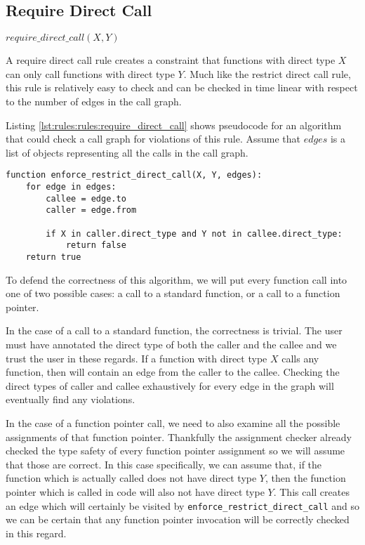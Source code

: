 \subsection{Require Direct Call}

\begin{center}
    $require\_direct\_call(X, Y)$
\end{center}

A require direct call rule creates a constraint that functions with direct type $X$ can only call functions with direct type $Y$. Much like the restrict direct call rule, this rule is relatively easy to check and can be checked in time linear with respect to the number of edges in the call graph.

Listing \ref{lst:rules:rules:require_direct_call} shows pseudocode for an algorithm that could check a call graph for violations of this rule.  Assume that $edges$ is a list of objects representing all the calls in the call graph.  

\noindent\begin{minipage}[t]{\linewidth}
\begin{lstlisting}[caption={Pseudocode for an algorithm that could check a $require\_direct\_call$ constraint.  This algorithm returns \lstinline{true} if the call graph respects the constraint and \lstinline{false} if the call graph violates it.},label={lst:rules:rules:require_direct_call}]
function enforce_restrict_direct_call(X, Y, edges):
    for edge in edges:
        callee = edge.to
        caller = edge.from

        if X in caller.direct_type and Y not in callee.direct_type:
            return false
    return true
\end{lstlisting}
\end{minipage}

To defend the correctness of this algorithm, we will put every function call into one of two possible cases: a call to a standard function, or a call to a function pointer.

In the case of a call to a standard function, the correctness is trivial.  The user must have annotated the direct type of both the caller and the callee and we trust the user in these regards.  If a function with direct type $X$ calls any function, then  will contain an edge from the caller to the callee.  Checking the direct types of caller and callee exhaustively for every edge in the graph will eventually find any violations.

In the case of a function pointer call, we need to also examine all the possible assignments of that function pointer.  Thankfully the assignment checker already checked the type safety of every function pointer assignment so we will assume that those are correct.  In this case specifically, we can assume that, if the function which is actually called does not have direct type $Y$, then the function pointer which is called in code will also not have direct type $Y$.  This call creates an edge which will certainly be visited by \lstinline{enforce_restrict_direct_call} and so we can be certain that any function pointer invocation will be correctly checked in this regard.
